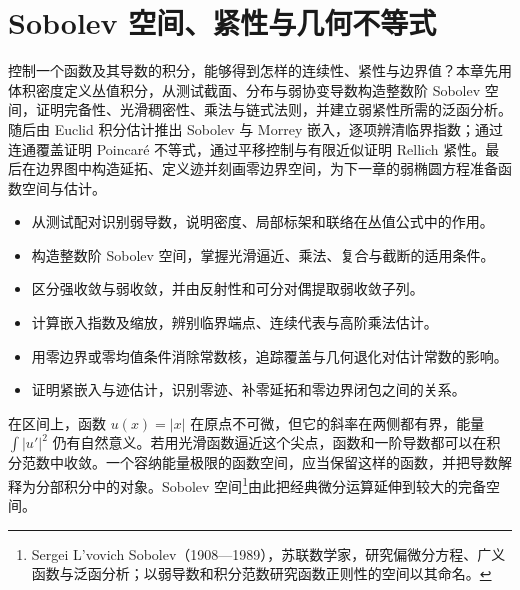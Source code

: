 
% 
% 

\chapter{Sobolev 空间、紧性与几何不等式}
\label{g3:ch:11}

\begin{chapterabstract}
控制一个函数及其导数的积分，能够得到怎样的连续性、紧性与边界值？本章先用体积密度定义丛值积分，从测试截面、分布与弱协变导数构造整数阶 Sobolev 空间，证明完备性、光滑稠密性、乘法与链式法则，并建立弱紧性所需的泛函分析。随后由 Euclid 积分估计推出 Sobolev 与 Morrey 嵌入，逐项辨清临界指数；通过连通覆盖证明 Poincaré 不等式，通过平移控制与有限近似证明 Rellich 紧性。最后在边界图中构造延拓、定义迹并刻画零边界空间，为下一章的弱椭圆方程准备函数空间与估计。
\end{chapterabstract}

\begin{learninggoals}
\begin{itemize}
	\item 从测试配对识别弱导数，说明密度、局部标架和联络在丛值公式中的作用。
	\item 构造整数阶 Sobolev 空间，掌握光滑逼近、乘法、复合与截断的适用条件。
	\item 区分强收敛与弱收敛，并由反射性和可分对偶提取弱收敛子列。
	\item 计算嵌入指数及缩放，辨别临界端点、连续代表与高阶乘法估计。
	\item 用零边界或零均值条件消除常数核，追踪覆盖与几何退化对估计常数的影响。
	\item 证明紧嵌入与迹估计，识别零迹、补零延拓和零边界闭包之间的关系。
\end{itemize}
\end{learninggoals}

在区间上，函数 \(u(x)=|x|\) 在原点不可微，但它的斜率在两侧都有界，能量 \(\int|u'|^2\) 仍有自然意义。若用光滑函数逼近这个尖点，函数和一阶导数都可以在积分范数中收敛。一个容纳能量极限的函数空间，应当保留这样的函数，并把导数解释为分部积分中的对象。Sobolev 空间\footnote{Sergei L'vovich Sobolev（1908—1989），苏联数学家，研究偏微分方程、广义函数与泛函分析；以弱导数和积分范数研究函数正则性的空间以其命名。}由此把经典微分运算延伸到较大的完备空间。

